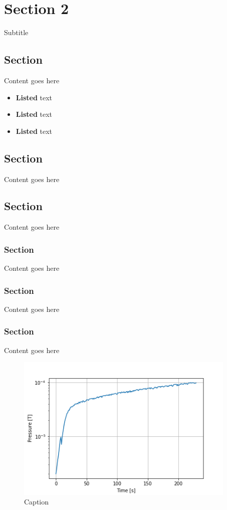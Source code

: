 \documentclass[12pt]{article}
\begin{document}
\section{Section 2}
Subtitle

\subsection{Section}
Content goes here

\begin{itemize}
	\item \textbf{Listed} text
    \item \textbf{Listed} text
    \item \textbf{Listed} text
\end{itemize}

\subsection{Section}
Content goes here

\subsection{Section}
Content goes here

\subsubsection{Section}
Content goes here

\subsubsection{Section}
Content goes here

\subsubsection{Section}
Content goes here

\begin{figure}[ht]
  \centering
  \includegraphics[height=7cm]{images/example.png}
  \caption{Caption}
\end{figure}
\end{document}
